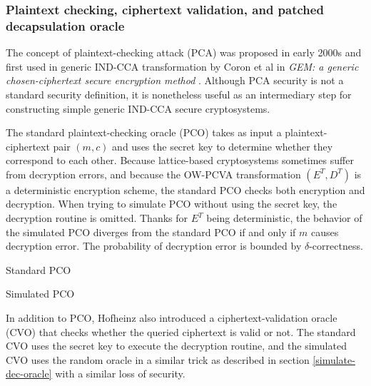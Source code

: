\documentclass{article}
\begin{document}
\subsubsection{Plaintext checking, ciphertext validation, and patched decapsulation oracle}
The concept of plaintext-checking attack (PCA) was proposed in early 2000s and first used in generic IND-CCA transformation by Coron et al in \textit{GEM: a generic chosen-ciphertext secure encryption method} \cite{jean2002gem}. Although PCA security is not a standard security definition, it is nonetheless useful as an intermediary step for constructing simple generic IND-CCA secure cryptosystems.

The standard plaintext-checking oracle (PCO) takes as input a plaintext-ciphertext pair $(m, c)$ and uses the secret key to determine whether they correspond to each other. Because lattice-based cryptosystems sometimes suffer from decryption errors, and because the OW-PCVA transformation $(E^T, D^T)$ is a deterministic encryption scheme, the standard PCO checks both encryption and decryption. When trying to simulate PCO without using the secret key, the decryption routine is omitted. Thanks for $E^T$ being deterministic, the behavior of the simulated PCO diverges from the standard PCO if and only if $m$ causes decryption error. The probability of decryption error is bounded by $\delta$-correctness.

\begin{multicols}{2}
    \begin{algorithm}[H]
        \SetAlgoLined
        \caption{Standard PCO}
    \end{algorithm}

    \columnbreak
    \begin{algorithm}[H]
        \SetAlgoLined
        \caption{Simulated PCO}
    \end{algorithm}
\end{multicols}

In addition to PCO, Hofheinz \cite{hofheinz2017modular} also introduced a ciphertext-validation oracle (CVO) that checks whether the queried ciphertext is valid or not. The standard CVO uses the secret key to execute the decryption routine, and the simulated CVO uses the random oracle in a similar trick as described in section \ref{simulate-dec-oracle} with a similar loss of security.
\end{document}
